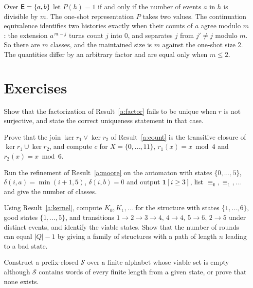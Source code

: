 \begin{example}\label{a:ex-counter}
Over $\mathsf{E}=\{a,b\}$ let $P(h)=1$ if and only if the number of events $a$ in $h$ is divisible by $m$. The one-shot representation $P$ takes two values. The continuation equivalence identifies two histories exactly when their counts of $a$ agree modulo $m$: the extension $a^{\,m-j}$ turns count $j$ into $0$, and separates $j$ from $j'\ne j$ modulo $m$. So there are $m$ classes, and the maintained size is $m$ against the one-shot size $2$. The quantities differ by an arbitrary factor and are equal only when $m\le2$.
\end{example}

\section*{Exercises}

\begin{exercise}
Show that the factorization of Result~\ref{a:factor} fails to be unique when $r$ is not surjective, and state the correct uniqueness statement in that case.
\end{exercise}

\begin{exercise}
Prove that the join $\ker r_1\vee\ker r_2$ of Result~\ref{a:count} is the transitive closure of $\ker r_1\cup\ker r_2$, and compute $c$ for $X=\{0,\dots,11\}$, $r_1(x)=x\bmod 4$ and $r_2(x)=x\bmod 6$.
\end{exercise}

\begin{exercise}
Run the refinement of Result~\ref{a:moore} on the automaton with states $\{0,\dots,5\}$, $\delta(i,a)=\min(i+1,5)$, $\delta(i,b)=0$ and output $\mathbf 1[i\ge3]$, list $\equiv_0,\equiv_1,\dots$ and give the number of classes.
\end{exercise}

\begin{exercise}
Using Result~\ref{a:kernel}, compute $K_0,K_1,\dots$ for the structure with states $\{1,\dots,6\}$, good states $\{1,\dots,5\}$, and transitions $1\to2\to3\to4$, $4\to4$, $5\to6$, $2\to5$ under distinct events, and identify the viable states. Show that the number of rounds can equal $|Q|-1$ by giving a family of structures with a path of length $n$ leading to a bad state.
\end{exercise}

\begin{exercise}
Construct a prefix-closed $\mathcal S$ over a finite alphabet whose viable set is empty although $\mathcal S$ contains words of every finite length from a given state, or prove that none exists.
\end{exercise}

